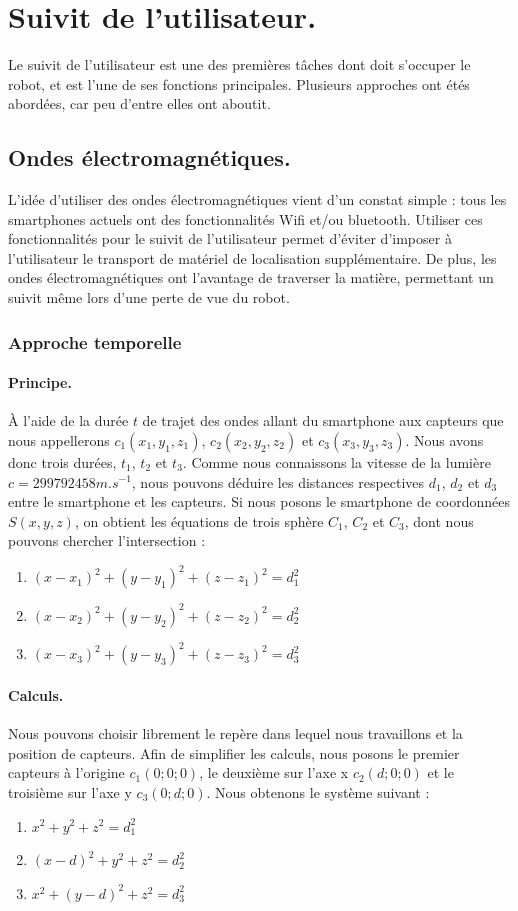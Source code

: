 \documentclass{article}
\begin{document}
\section{Suivit de l'utilisateur.}
Le suivit de l'utilisateur est une des premières tâches dont doit s'occuper le robot, et est l'une de ses fonctions principales. Plusieurs approches ont étés abordées, car peu d'entre elles ont aboutit.

\subsection{Ondes électromagnétiques.}
L'idée d'utiliser des ondes électromagnétiques vient d'un constat simple : tous les smartphones actuels ont des fonctionnalités Wifi et/ou bluetooth. Utiliser ces fonctionnalités pour le suivit de l'utilisateur permet d'éviter d'imposer à l'utilisateur le transport de matériel de localisation supplémentaire. De plus, les ondes électromagnétiques ont l'avantage de traverser la matière, permettant un suivit même lors d'une perte de vue du robot.

\subsubsection{Approche temporelle}
\paragraph{Principe.}
À l'aide de la durée $t$ de trajet des ondes allant du smartphone aux capteurs que nous appellerons $c_1(x_1,y_1,z_1)$, $c_2(x_2,y_2,z_2)$ et $c_3(x_3,y_3,z_3)$. Nous avons donc trois durées, $t_1$, $t_2$ et $t_3$. Comme nous connaissons la vitesse de la lumière $c=299792458m.s^{-1}$, nous pouvons déduire les distances respectives $d_1$, $d_2$ et $d_3$ entre le smartphone et les capteurs. Si nous posons le smartphone de coordonnées $S(x,y,z)$, on obtient les équations de trois sphère $C_1$, $C_2$ et $C_3$, dont nous pouvons chercher l'intersection :
\begin{enumerate}
    \item $(x-x_1)^2 + (y-y_1)^2 + (z-z_1)^2 = d_1^2$
    \item $(x-x_2)^2 + (y-y_2)^2 + (z-z_2)^2 = d_2^2$
    \item $(x-x_3)^2 + (y-y_3)^2 + (z-z_3)^2 = d_3^2$
\end{enumerate}

\paragraph{Calculs.}
Nous pouvons choisir librement le repère dans lequel nous travaillons et la position de capteurs. Afin de simplifier les calculs, nous posons le premier capteurs à l'origine $c_1(0;0;0)$, le deuxième sur l'axe x $c_2(d;0;0)$ et le troisième sur l'axe y $c_3(0;d;0)$. Nous obtenons le système suivant :
\begin{enumerate}
    \item $x^2 + y^2 + z^2 = d_1^2$
    \item $(x-d)^2 + y^2 + z^2 = d_2^2$
    \item $x^2 + (y-d)^2 + z^2 = d_3^2$
\end{enumerate}
\end{document}
